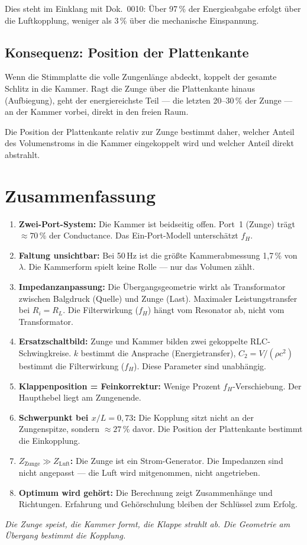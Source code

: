 \documentclass[11pt,a4paper]{article}
\begin{document}
Dies steht im Einklang mit Dok.~0010: Über 97\,\% der Energieabgabe erfolgt
über die Luftkopplung, weniger als 3\,\% über die mechanische Einspannung.

\subsection{Konsequenz: Position der Plattenkante}

Wenn die Stimmplatte die volle Zungenlänge abdeckt, koppelt der gesamte
Schlitz in die Kammer. Ragt die Zunge über die Plattenkante hinaus (Aufbiegung),
geht der energiereichste Teil --- die letzten 20--30\,\% der Zunge ---
an der Kammer vorbei, direkt in den freien Raum.

Die Position der Plattenkante relativ zur Zunge bestimmt daher, welcher Anteil
des Volumenstroms in die Kammer eingekoppelt wird und welcher Anteil
direkt abstrahlt.

\section{Zusammenfassung}

\begin{enumerate}
\item \textbf{Zwei-Port-System:} Die Kammer ist beidseitig offen.
  Port~1 (Zunge) trägt $\approx 70\,\%$ der Conductance.
  Das Ein-Port-Modell unterschätzt $f_H$.
\item \textbf{Faltung unsichtbar:} Bei 50\,Hz ist die größte Kammerabmessung
  1,7\,\% von $\lambda$. Die Kammerform spielt keine Rolle ---
  nur das Volumen zählt.
\item \textbf{Impedanzanpassung:} Die Übergangsgeometrie wirkt als Transformator
  zwischen Balgdruck (Quelle) und Zunge (Last). Maximaler Leistungstransfer
  bei $R_i = R_L$. Die Filterwirkung ($f_H$) hängt vom Resonator ab,
  nicht vom Transformator.
\item \textbf{Ersatzschaltbild:} Zunge und Kammer bilden zwei gekoppelte
  RLC-Schwingkreise. $k$ bestimmt die Ansprache (Energietransfer),
  $C_2 = V/(\rho c^2)$ bestimmt die Filterwirkung ($f_H$).
  Diese Parameter sind unabhängig.
\item \textbf{Klappenposition = Feinkorrektur:} Wenige Prozent $f_H$-Verschiebung.
  Der Haupthebel liegt am Zungenende.
\item \textbf{Schwerpunkt bei $x/L = 0{,}73$:} Die Kopplung sitzt nicht an
  der Zungenspitze, sondern $\approx 27\,\%$ davor.
  Die Position der Plattenkante bestimmt die Einkopplung.
\item \textbf{$Z_\mathrm{Zunge} \gg Z_\mathrm{Luft}$:} Die Zunge ist ein
  Strom-Generator. Die Impedanzen sind nicht angepasst --- die Luft wird
  mitgenommen, nicht angetrieben.
\item \textbf{Optimum wird gehört:} Die Berechnung zeigt Zusammenhänge und
  Richtungen. Erfahrung und Gehörschulung bleiben der Schlüssel zum Erfolg.
\end{enumerate}

\bigskip
\textit{Die Zunge speist, die Kammer formt, die Klappe strahlt ab.
Die Geometrie am Übergang bestimmt die Kopplung.}
\end{document}
